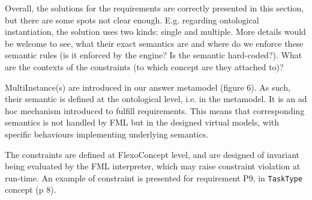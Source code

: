 \documentclass[10pt]{article}
\begin{document}
\begin{response}{Overall, the solutions for the requirements are correctly presented in this section, but there are some spots not clear enough. E.g. regarding ontological instantiation, the solution uses two kinds: single and multiple. More details would be welcome to see, what their exact semantics are and where do we enforce these semantic rules (is it enforced by the engine? Is the semantic hard-coded?). What are the contexts of the constraints (to which concept are they attached to)?}


MultiInstance(s) are introduced in our answer metamodel (figure 6). As such, their semantic is defined at the ontological level, i.e. in the metamodel. It is an ad hoc mechanism introduced to fulfill requirements. This means that corresponding semantics is not handled by FML but in the designed virtual models, with specific behaviours implementing underlying semantics.%


The constraints are defined at FlexoConcept level, and are designed of invariant being evaluated by the FML interpreter, which may raise constraint violation at run-time. An example of constraint is presented for requirement P9, in \texttt{TaskType} concept (p 8).

\end{response}
\end{document}
